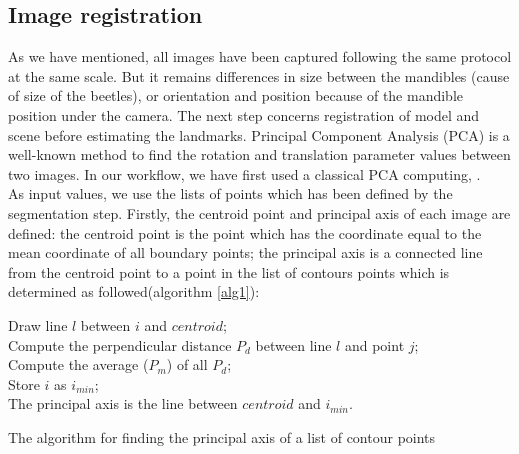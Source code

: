 \documentclass[twoside,twocolumn,10pt]{article}
\begin{document}
\subsection{Image registration}
As we have mentioned, all images have been captured following the same protocol at the same scale. But it remains differences in size between the mandibles (cause of size of the beetles), or orientation and position because of the mandible position under the camera. The next step concerns registration of model and scene before estimating the landmarks. Principal Component Analysis (PCA) is a well-known method to find the rotation and translation parameter values between two images. In our workflow, we have first used a classical PCA computing\cite{bsspca}, \cite{shlens2014tutorial}.\\
As input values, we use the lists of points which has been defined by the segmentation step. Firstly, the centroid point and principal axis of each image are defined: the centroid point is the point which has the coordinate equal to the mean coordinate of all boundary points; the principal axis is a connected line from the centroid point to a point in the list of contours points which is determined as followed(algorithm \ref{alg1}):
\begin{algorithm}
	{
		Draw line $l$ between $i$ and $centroid$;\\
		{
			{
				Compute the perpendicular distance $P_d$ between line $l$ and point $j$;\\
			}		
		}
		Compute the average ($P_m$) of all $P_d$;\\
		{
			Store $i$ as $i_{min}$;\\
		}
	}
	The principal axis is the line between $centroid$ and $i_{min}$.
	\caption{The algorithm for finding the principal axis of a list of contour points}
	\label{alg1}
\end{algorithm}\\
\end{document}
